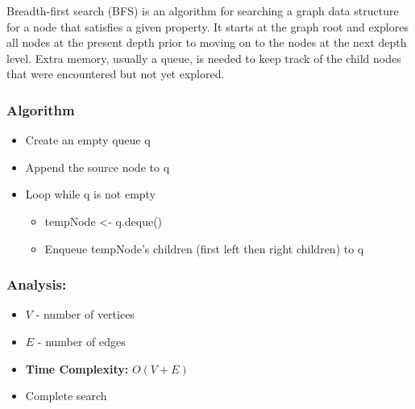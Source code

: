 Breadth-first search (BFS) is an algorithm for searching a graph data
structure for a node that satisfies a given property. It starts at the
graph root and explores all nodes at the present depth prior to moving
on to the nodes at the next depth level. Extra memory, usually a queue,
is needed to keep track of the child nodes that were encountered but not
yet explored.

\subsubsection*{Algorithm}

\begin{itemize}
    \item Create an empty queue q
    \item Append the source node to q
    \item Loop while q is not empty
          \begin{itemize}
              \item tempNode <- q.deque()
              \item Enqueue tempNode's children (first left then right children) to q
          \end{itemize}
\end{itemize}

\subsubsection*{Analysis:}

\begin{itemize}
    \item $V$ - number of vertices
    \item $E$ - number of edges
    \item \textbf{Time Complexity:} $O(V+E)$
    \item Complete search
\end{itemize}